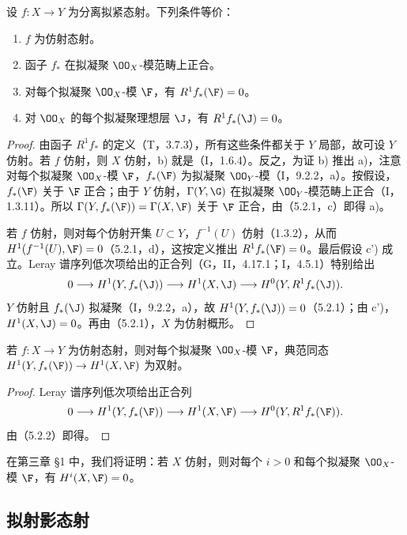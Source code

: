 设 $f:X\to Y$ 为分离拟紧态射。下列条件等价：
\begin{enumerate}[label=\textup{a)}]
\item $f$ 为仿射态射。
\item[\textup{b)}] 函子 $f_*$ 在拟凝聚 $\OO_X$-模范畴上正合。
\item[\textup{c)}] 对每个拟凝聚 $\OO_X$-模 $\F$，有 $R^1f_*(\F)=0$。
\item[\textup{c')}] 对 $\OO_X$ 的每个拟凝聚理想层 $\J$，有 $R^1f_*(\J)=0$。
\end{enumerate}
\begin{proof}
由函子 $R^1f_*$ 的定义（T，3.7.3），所有这些条件都关于 $Y$ 局部，故可设 $Y$ 仿射。若 $f$ 仿射，则 $X$ 仿射，b) 就是（I，1.6.4）。反之，为证 b) 推出 a)，注意对每个拟凝聚 $\OO_X$-模 $\F$，$f_*(\F)$ 为拟凝聚 $\OO_Y$-模（I，9.2.2，a）。按假设，$f_*(\F)$ 关于 $\F$ 正合；由于 $Y$ 仿射，$\Gamma(Y,\G)$ 在拟凝聚 $\OO_Y$-模范畴上正合（I，1.3.11）。所以
$\Gamma(Y,f_*(\F))=\Gamma(X,\F)$ 关于 $\F$ 正合，由（5.2.1，c）即得 a)。

若 $f$ 仿射，则对每个仿射开集 $U\subset Y$，$f^{-1}(U)$ 仿射（1.3.2），从而
$H^1(f^{-1}(U),\F)=0$（5.2.1，d），这按定义推出 $R^1f_*(\F)=0$。最后假设 c') 成立。Leray 谱序列低次项给出的正合列（G，II，4.17.1；I，4.5.1）特别给出
\[
0\longrightarrow H^1(Y,f_*(\J))\longrightarrow H^1(X,\J)
\longrightarrow H^0(Y,R^1f_*(\J)).
\]
$Y$ 仿射且 $f_*(\J)$ 拟凝聚（I，9.2.2，a），故 $H^1(Y,f_*(\J))=0$（5.2.1）；由 c')，$H^1(X,\J)=0$。再由（5.2.1），$X$ 为仿射概形。
\end{proof}

若 $f:X\to Y$ 为仿射态射，则对每个拟凝聚 $\OO_X$-模 $\F$，典范同态
$H^1(Y,f_*(\F))\to H^1(X,\F)$ 为双射。
\begin{proof}
Leray 谱序列低次项给出正合列
\[
0\longrightarrow H^1(Y,f_*(\F))\longrightarrow H^1(X,\F)
\longrightarrow H^0(Y,R^1f_*(\F)).
\]
由（5.2.2）即得。
\end{proof}

在第三章 §1 中，我们将证明：若 $X$ 仿射，则对每个 $i>0$ 和每个拟凝聚 $\OO_X$-模 $\F$，有 $H^i(X,\F)=0$。

\subsection{拟射影态射}

